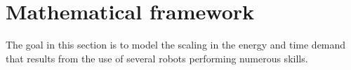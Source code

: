 \section{Mathematical framework}\label{sec:transfer_learning}
The goal in this section is to model the scaling in the energy and time demand that results from the use of several robots performing numerous skills.


